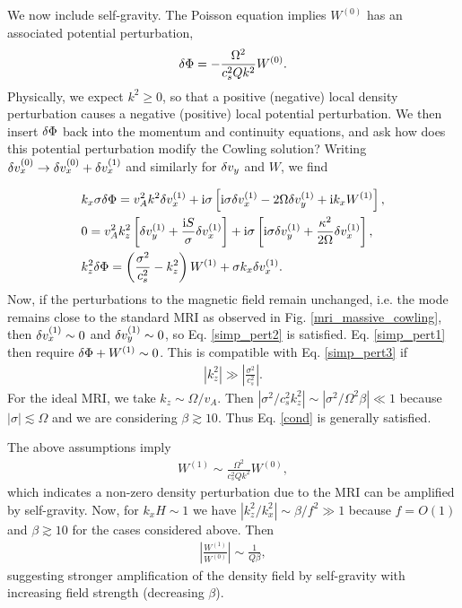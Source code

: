 
We now include self-gravity.  The Poisson equation implies $W^{(0)}$
has an associated potential perturbation,     
\begin{align} 
  \delta \Phi = -\frac{\Omega^2}{c_s^2 Q k^2} W^{(0)}.
\end{align}
Physically, we expect $k^2\geq0$, so that a positive (negative) local density
perturbation causes a negative (positive) local potential
perturbation. We then insert $\delta \Phi$ back into the momentum and
continuity equations, and ask how does this potential perturbation
modify the Cowling solution? Writing $\delta v_x^{(0)} \to \delta v_x^{(0)} +
\delta v_x^{(1)}$ and similarly for $\delta v_y $ and $ W$, we find 


\begin{align}
  &   k_x\sigma \delta \Phi = v_A^2k^2\delta v_x^{(1)} + \mathrm{i}\sigma\left[\mathrm{i}\sigma
  \delta v_x^{(1)} - 2\Omega\delta v_y^{(1)} + \mathrm{i} k_x W^{(1)}\right], \label{simp_pert1}\\ 
  &  0= v_A^2k_z^2\left[\delta v_y^{(1)} + \frac{\mathrm{i} S
    }{\sigma}\delta v_x^{(1)}\right] + \mathrm{i}\sigma\left[\mathrm{i}\sigma\delta v_y^{(1)} +
  \frac{\kappa^2}{2\Omega}\delta v_x^{(1)}\right],\label{simp_pert2}\\
  & k_z^2\delta \Phi  = \left(\frac{\sigma^2}{c_s^2}-k_z^2\right)W^{(1)} +
  \sigma k_x \delta v_x^{(1)}.\label{simp_pert3} 
\end{align}
Now, if the perturbations to the magnetic field remain
unchanged, i.e. the mode remains close to the standard MRI as observed
in Fig. \ref{mri_massive_cowling}, then $\delta v_x^{(1)} \sim 0$ and
$\delta v_y^{(1)}\sim0$, so Eq. \ref{simp_pert2} is 
satisfied. Eq. \ref{simp_pert1} then require $\delta \Phi +
W^{(1)}\sim0$. This is compatible with Eq. \ref{simp_pert3} if 
\begin{align}
  \left|k_z^2\right| \gg \left|\frac{\sigma^2}{c_s^2}\right|. \label{cond}
\end{align}
For the ideal MRI,  we take $k_z\sim \Omega/v_A$. Then
$|\sigma^2/c_s^2k_z^2|\sim |\sigma^2/\Omega^2\beta|\ll1$ because
$|\sigma|\lesssim \Omega$ and we are considering $\beta\gtrsim 10$. 
Thus Eq. \ref{cond} is generally satisfied.   

The above assumptions imply
\begin{align}
  W^{(1)} \sim \frac{\Omega^2}{c_s^2 Q k^2} W^{(0)},\label{feedback}
\end{align} 
which indicates a non-zero density perturbation due to the
MRI can be amplified by self-gravity. Now, for $k_xH\sim 1$ we have
$|k_z^2/k_x^2|\sim \beta/f^2\gg1$ because $f=O(1)$ and $\beta\gtrsim10$
for the cases considered above. Then
\begin{align}
  \left|\frac{W^{(1)}}{W^{(0)}}\right| \sim \frac{1}{Q\beta}, 
\end{align}
 suggesting stronger amplification of the density field by 
 self-gravity with increasing field strength (decreasing
 $\beta$). 

